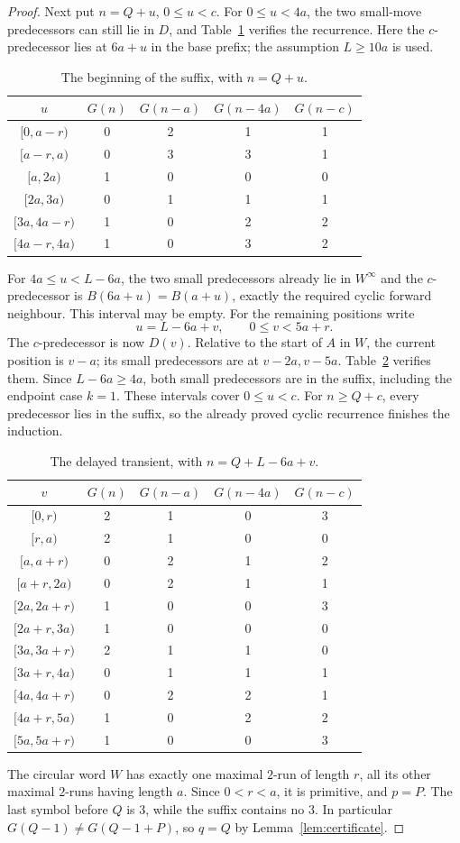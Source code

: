 \documentclass[11pt]{article}
\theoremstyle{remark}\newtheorem{remark}[theorem]{Remark}
\newcommand{\per}{^{\infty}}
\begin{document}
\begin{proof}
Next put $n=Q+u$, $0\le u<c$. For $0\le u<4a$, the two small-move predecessors can still lie in $D$, and Table~\ref{tab:early} verifies the recurrence. Here the $c$-predecessor lies at $6a+u$ in the base prefix; the assumption $L\ge10a$ is used.
\begin{table}[ht]\centering\small
\begin{tabular}{c|c|ccc}\toprule
$u$ & $G(n)$ & $G(n-a)$ & $G(n-4a)$ & $G(n-c)$\\\midrule
$[0,a-r)$&0&2&1&1\\
$[a-r,a)$&0&3&3&1\\
$[a,2a)$&1&0&0&0\\
$[2a,3a)$&0&1&1&1\\
$[3a,4a-r)$&1&0&2&2\\
$[4a-r,4a)$&1&0&3&2\\\bottomrule
\end{tabular}
\caption{The beginning of the suffix, with $n=Q+u$.}\label{tab:early}
\end{table}
For $4a\le u<L-6a$, the two small predecessors already lie in $W\per$ and the $c$-predecessor is $B(6a+u)=B(a+u)$, exactly the required cyclic forward neighbour. This interval may be empty. For the remaining positions write
\[u=L-6a+v,\qquad0\le v<5a+r.\]
The $c$-predecessor is now $D(v)$. Relative to the start of $A$ in $W$, the current position is $v-a$; its small predecessors are at $v-2a,v-5a$. Table~\ref{tab:late} verifies them. Since $L-6a\ge4a$, both small predecessors are in the suffix, including the endpoint case $k=1$. These intervals cover $0\le u<c$. For $n\ge Q+c$, every predecessor lies in the suffix, so the already proved cyclic recurrence finishes the induction.
\begin{table}[ht]\centering\small
\begin{tabular}{c|c|ccc}\toprule
$v$ & $G(n)$ & $G(n-a)$ & $G(n-4a)$ & $G(n-c)$\\\midrule
$[0,r)$&2&1&0&3\\
$[r,a)$&2&1&0&0\\
$[a,a+r)$&0&2&1&2\\
$[a+r,2a)$&0&2&1&1\\
$[2a,2a+r)$&1&0&0&3\\
$[2a+r,3a)$&1&0&0&0\\
$[3a,3a+r)$&2&1&1&0\\
$[3a+r,4a)$&0&1&1&1\\
$[4a,4a+r)$&0&2&2&1\\
$[4a+r,5a)$&1&0&2&2\\
$[5a,5a+r)$&1&0&0&3\\\bottomrule
\end{tabular}
\caption{The delayed transient, with $n=Q+L-6a+v$.}\label{tab:late}
\end{table}

The circular word $W$ has exactly one maximal $2$-run of length $r$, all its other maximal $2$-runs having length $a$. Since $0<r<a$, it is primitive, and $p=P$. The last symbol before $Q$ is $3$, while the suffix contains no $3$. In particular $G(Q-1)\ne G(Q-1+P)$, so $q=Q$ by Lemma~\ref{lem:certificate}.
\end{proof}
\end{document}
